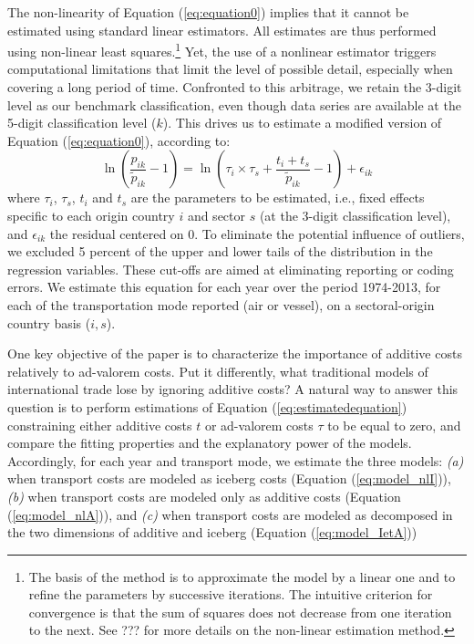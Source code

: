 \documentclass[a4paper,11pt]{article}
\begin{document}
The non-linearity of Equation (\ref{eq:equation0}) implies that it cannot be estimated using standard linear estimators. All estimates are thus performed using non-linear least squares.\footnote{The basis of the method is to approximate the model by a linear one and to refine the parameters by successive iterations. The intuitive criterion for convergence is that the sum of squares does not decrease from one iteration to the next. See ??? for more details on the non-linear estimation method.} Yet, the use of a nonlinear estimator triggers computational limitations that limit the level of possible detail, especially when covering a long period of time. Confronted to this arbitrage, we retain the 3-digit level as our benchmark classification, even though data series are available at the 5-digit classification level ($k$). This drives us to estimate a modified version of Equation (\ref{eq:equation0}), according to:
\begin{equation}
\ln\left(\frac{p_{ik}}{\widetilde{p}_{ik}}-1 \right)= \ln \left(\tau_{i} \times \tau_{s}+\frac{t_{i} + t_{s}}{\widetilde{p}_{ik}}-1 \right) + \epsilon_{ik} \label{eq:estimatedequation}
\end{equation}
where $\tau_{i}$, $\tau_{s}$, $t_{i}$ and $t_{s}$ are the parameters to be estimated, i.e., fixed effects specific to each origin country $i$ and sector $s$ (at the 3-digit classification level), and $\epsilon_{ik}$ the residual centered on 0. To eliminate the potential influence of outliers, we excluded 5 percent of the upper and lower tails of the distribution in the regression variables.
These cut-offs are aimed at eliminating reporting or coding errors. We estimate this equation for each year over the period 1974-2013, for each of the transportation mode reported (air or vessel), on a sectoral-origin country basis ($i,s$).\smallskip

One key objective of the paper is to characterize the importance of additive costs relatively to ad-valorem costs. Put it differently, what traditional models of international trade lose by ignoring additive costs? A natural way to answer this question is to perform estimations of Equation (\ref{eq:estimatedequation}) constraining either additive costs $t$ or ad-valorem costs $\tau$ to be equal to zero, and compare the fitting properties and the explanatory power of the models. Accordingly, for each year and transport mode, we estimate the three models: \textit{(a)} when transport costs are modeled as iceberg costs (Equation (\ref{eq:model_nlI})), \textit{(b)} when transport costs are modeled only as additive costs (Equation (\ref{eq:model_nlA})), and \textit{(c)} when transport costs are modeled as decomposed in the two dimensions of additive and iceberg (Equation (\ref{eq:model_IetA}))
\end{document}
